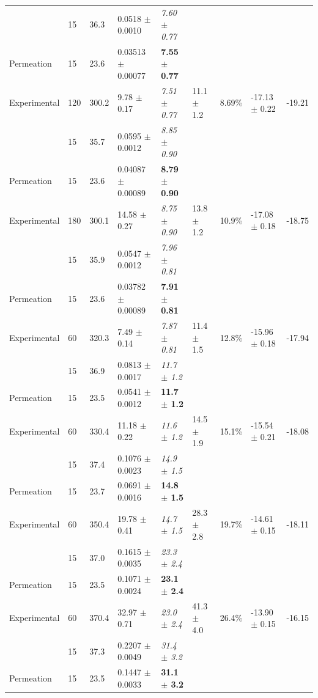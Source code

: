 \begin{chplandscape}
\begin{small}
\begin{longtable}{p{1.9cm}p{0.9cm}p{1.0cm}p{2.7cm}p{1.8cm}p{1.7cm}p{1.5cm}p{2.1cm}p{1.4cm}}
 & 15 & 36.3 & 0.0518 $\pm$ 0.0010 & \textit{7.60 $\pm$ 0.77} &  &  &  &  \\
Permeation & 15 & 23.6 & 0.03513 $\pm$ 0.00077 & \textbf{7.55 $\pm$ 0.77} &  &  &  &  \\
Experimental & 120 & 300.2 & 9.78 $\pm$ 0.17 & \textit{7.51 $\pm$ 0.77} & 11.1 $\pm$ 1.2 & 8.69\% & -17.13 $\pm$ 0.22 & -19.21 \\
 & 15 & 35.7 & 0.0595 $\pm$ 0.0012 & \textit{8.85 $\pm$ 0.90} &  &  &  &  \\
Permeation & 15 & 23.6 & 0.04087 $\pm$ 0.00089 & \textbf{8.79 $\pm$ 0.90} &  &  &  &  \\
Experimental & 180 & 300.1 & 14.58 $\pm$ 0.27 & \textit{8.75 $\pm$ 0.90} & 13.8 $\pm$ 1.2 & 10.9\% & -17.08 $\pm$ 0.18 & -18.75 \\
 & 15 & 35.9 & 0.0547 $\pm$ 0.0012 & \textit{7.96 $\pm$ 0.81} &  &  &  &  \\
Permeation & 15 & 23.6 & 0.03782 $\pm$ 0.00089 & \textbf{7.91 $\pm$ 0.81} &  &  &  &  \\
Experimental & 60 & 320.3 & 7.49 $\pm$ 0.14 & \textit{7.87 $\pm$ 0.81} & 11.4 $\pm$ 1.5 & 12.8\% & -15.96 $\pm$ 0.18 & -17.94 \\
 & 15 & 36.9 & 0.0813 $\pm$ 0.0017 & \textit{11.7 $\pm$ 1.2} &  &  &  &  \\
Permeation & 15 & 23.5 & 0.0541 $\pm$ 0.0012 & \textbf{11.7 $\pm$ 1.2} &  &  &  &  \\
Experimental & 60 & 330.4 & 11.18 $\pm$ 0.22 & \textit{11.6 $\pm$ 1.2} & 14.5 $\pm$ 1.9 & 15.1\% & -15.54 $\pm$ 0.21 & -18.08 \\
 & 15 & 37.4 & 0.1076 $\pm$ 0.0023 & \textit{14.9 $\pm$ 1.5} &  &  &  &  \\
Permeation & 15 & 23.7 & 0.0691 $\pm$ 0.0016 & \textbf{14.8 $\pm$ 1.5} &  &  &  &  \\
Experimental & 60 & 350.4 & 19.78 $\pm$ 0.41 & \textit{14.7 $\pm$ 1.5} & 28.3 $\pm$ 2.8 & 19.7\% & -14.61 $\pm$ 0.15 & -18.11 \\
 & 15 & 37.0 & 0.1615 $\pm$ 0.0035 & \textit{23.3 $\pm$ 2.4} &  &  &  &  \\
Permeation & 15 & 23.5 & 0.1071 $\pm$ 0.0024 & \textbf{23.1 $\pm$ 2.4} &  &  &  &  \\
Experimental & 60 & 370.4 & 32.97 $\pm$ 0.71 & \textit{23.0 $\pm$ 2.4} & 41.3 $\pm$ 4.0 & 26.4\% & -13.90 $\pm$ 0.15 & -16.15 \\
 & 15 & 37.3 & 0.2207 $\pm$ 0.0049 & \textit{31.4 $\pm$ 3.2} &  &  &  &  \\
Permeation & 15 & 23.5 & 0.1447 $\pm$ 0.0033 & \textbf{31.1 $\pm$ 3.2} &  &  &  &  \\

\end{longtable}
\end{small}
\end{chplandscape}
